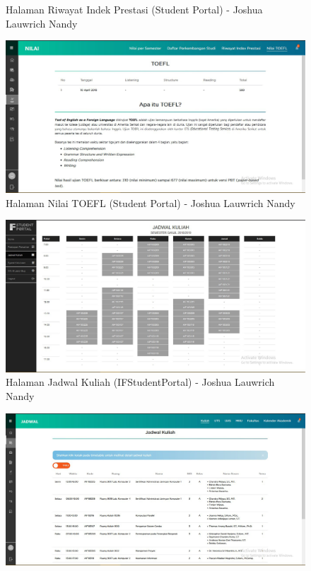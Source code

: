 \begin{itemize}
\begin{enumerate}
\begin{figure}[H]
			\caption{Halaman Riwayat Indek Prestasi (Student Portal) - Joshua Lauwrich Nandy}
			\label{fig:2016_2_rip_studentportal}
		\end{figure}
		\begin{figure}[H]
			\centering
			\includegraphics[scale=0.45]{Gambar/HasilPengujian/2016_2_toefl_studentportal}
			\caption{Halaman Nilai TOEFL (Student Portal) - Joshua Lauwrich Nandy}
			\label{fig:2016_2_toefl_studentportal}
		\end{figure}
		\begin{figure}[H]
			\centering
			\includegraphics[scale=0.45]{Gambar/HasilPengujian/2016_2_jadwal_kuliah_ifstudentportal}
			\caption{Halaman Jadwal Kuliah (IFStudentPortal) - Joshua Lauwrich Nandy}
			\label{fig:2016_2_jadwal_kuliah_ifstudentportal}
		\end{figure}
		\begin{figure}[H]
			\centering
			\includegraphics[scale=0.45]{Gambar/HasilPengujian/2016_2_jadwal_kuliah_studentportal}

\end{figure}
\end{enumerate}
\end{itemize}
